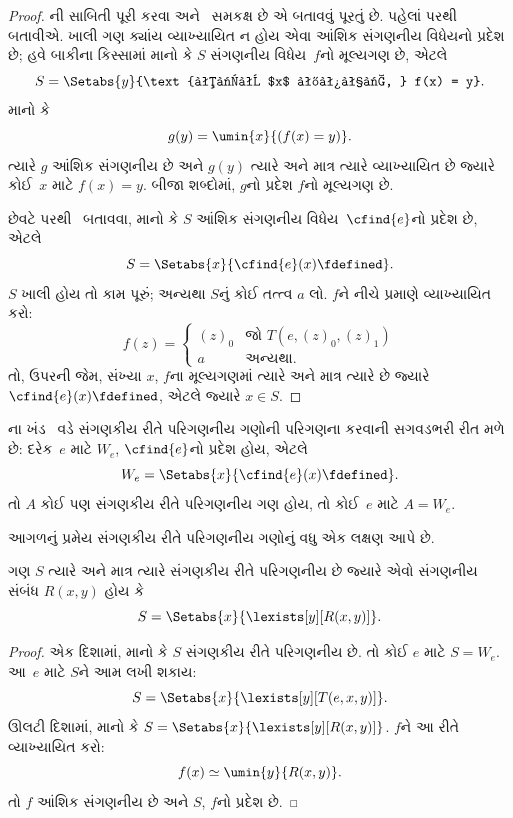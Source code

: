 \documentclass[../../../include/open-logic-section]{subfiles}
\begin{document}
\begin{proof}
ની સાબિતી પૂરી કરવા
 અને~ સમકક્ષ છે એ
બતાવવું પૂરતું છે. પહેલાં  પરથી
 બતાવીએ. ખાલી ગણ ક્યાંય વ્યાખ્યાયિત
ન હોય એવા આંશિક સંગણનીય વિધેયનો પ્રદેશ છે; હવે બાકીના
કિસ્સામાં માનો કે $S$ સંગણનીય વિધેય~$f$નો મૂલ્યગણ છે, એટલે
\[
S = \Setabs{y}{\text{કોઈ $x$ માટે, } f(x) = y}.
\]
માનો કે
\[
g(y) = \umin{x}{(f(x) = y)}.
\]
ત્યારે $g$ આંશિક સંગણનીય છે અને $g(y)$ ત્યારે અને માત્ર
ત્યારે વ્યાખ્યાયિત છે જ્યારે કોઈ~$x$ માટે $f(x) = y$.
બીજા શબ્દોમાં, $g$નો પ્રદેશ $f$નો મૂલ્યગણ છે.

છેવટે  પરથી~
બતાવવા, માનો કે $S$ આંશિક સંગણનીય વિધેય~$\cfind{e}$નો
પ્રદેશ છે, એટલે
\[
S = \Setabs{x}{\cfind{e}(x) \fdefined}.
\]
$S$ ખાલી હોય તો કામ પૂરું; અન્યથા $S$નું કોઈ તત્ત્વ $a$
લો. $f$ને નીચે પ્રમાણે વ્યાખ્યાયિત કરો:
\[
f(z) = \begin{cases}
(z)_0 & \text{જો $T(e,(z)_0,(z)_1)$} \\
a & \text{અન્યથા.}
\end{cases}
\]
તો, ઉપરની જેમ, સંખ્યા $x$, $f$ના મૂલ્યગણમાં ત્યારે અને
માત્ર ત્યારે છે જ્યારે $\cfind{e}(x) \fdefined$, એટલે જ્યારે
$x \in S$. 
\end{proof}

ના ખંડ~ વડે
સંગણકીય રીતે પરિગણનીય ગણોની પરિગણના કરવાની સગવડભરી રીત
મળે છે: દરેક~$e$ માટે $W_e$, $\cfind{e}$નો પ્રદેશ હોય, એટલે
\[
W_e = \Setabs{x}{\cfind{e}(x) \fdefined}.
\]
તો $A$ કોઈ પણ સંગણકીય રીતે પરિગણનીય ગણ હોય, તો કોઈ~$e$
માટે $A = W_e$.

આગળનું પ્રમેય સંગણકીય રીતે પરિગણનીય ગણોનું વધુ એક લક્ષણ આપે છે.

\begin{thm}
ગણ $S$ ત્યારે અને માત્ર ત્યારે સંગણકીય રીતે પરિગણનીય છે
જ્યારે એવો સંગણનીય સંબંધ $R(x,y)$ હોય કે
\[
S = \Setabs{ x }{ \lexists[y][R(x,y)] }.
\]
\end{thm}

\begin{proof}
એક દિશામાં, માનો કે $S$ સંગણકીય રીતે પરિગણનીય છે.
તો કોઈ $e$ માટે $S = W_e$. આ~$e$ માટે $S$ને આમ લખી શકાય:
\[
S = \Setabs{ x }{ \lexists[y][T(e, x, y)] }.
\]
ઊલટી દિશામાં, માનો કે $S = \Setabs{ x }{
  \lexists[y][R(x, y)] }$. $f$ને આ રીતે વ્યાખ્યાયિત કરો:
\[
f(x) \simeq \umin{y}{R(x, y)}.
\]
તો $f$ આંશિક સંગણનીય છે અને $S$, $f$નો પ્રદેશ છે.
\end{proof}
\end{document}
